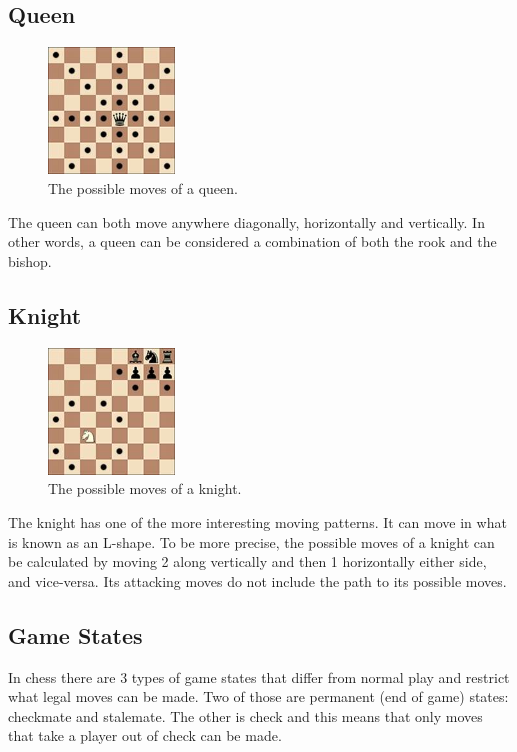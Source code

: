 \subsection{Queen}
\begin{figure}[H]
\centering
	\includegraphics[width=0.3\textwidth]{images/boards/queen_movement}
	\caption{The possible moves of a queen.}
\end{figure}
The queen can both move anywhere diagonally, horizontally and vertically. In other words, a queen can be considered a combination of both the rook and the bishop.
\subsection{Knight}
\begin{figure}[H]
\centering
	\includegraphics[width=0.3\textwidth]{images/boards/knight_movement}
	\caption{The possible moves of a knight.}
\end{figure}
The knight has one of the more interesting moving patterns. It can move in what is known as an L-shape. To be more precise, the possible moves of a knight can be calculated by moving 2 along vertically and then 1 horizontally either side, and vice-versa. Its attacking moves do not include the path to its possible moves.
\subsection{Game States}
In chess there are 3 types of game states that differ from normal play and restrict what legal moves can be made. Two of those are permanent (end of game) states: checkmate and stalemate. The other is check and this means that only moves that take a player out of check can be made. 
